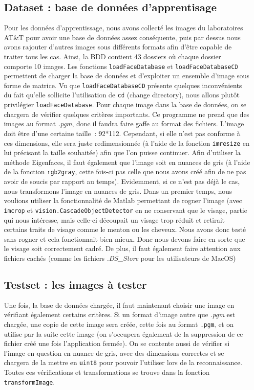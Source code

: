 \documentclass[12pt,a4paper]{article}
\begin{document}
\subsection{Dataset : base de données d'apprentisage}
Pour les données d'apprentissage, nous avons collecté les images du laboratoires AT\&T pour avoir une base de données assez conséquente, puis par dessus nous avons rajouter d'autres images sous différents formats afin d'être capable de traiter tous les cas.
Ainsi, la BDD contient 43 dossiers où chaque dossier comporte 10 images.
\newline
Les fonctions \texttt{loadFaceDatabase} et  \texttt{loadFaceDatabaseCD} permettent de charger la base de données et d'exploiter un ensemble d'image sous forme de matrice. Vu que \texttt{loadFaceDatabaseCD} présente quelques inconvénients du fait qu'elle sollicite l'utilisation de \texttt{cd} (change directory), nous allons plutôt privilégier \texttt{loadFaceDatabase}. 
\newline
Pour chaque image dans la base de données, on se chargera de vérifier quelques critères importants. Ce programme ne prend que des images au format \textit{.pgm}, donc il faudra faire gaffe au format des fichiers. L’image doit être d’une certaine taille : 92*112. Cependant, si elle n’est pas conforme à ces dimensions, elle sera juste redimensionnée (à l'aide de la fonction \texttt{imresize} en lui précisant la taille souhaitée) afin que l’on puisse continuer. Afin d’utiliser la méthode Eigenfaces, il faut également que l’image soit en nuances de gris (à l'aide de la fonction \texttt{rgb2gray}, cette fois-ci pas celle que nous avons créé afin de ne pas avoir de soucis par rapport au temps). Evidemment, si ce n’est pas déjà le cas, nous transformons l’image en nuances de gris. Dans un premier temps, nous voulions utiliser la fonctionnalité de Matlab permettant de rogner l’image (avec \texttt{imcrop} et \texttt{vision.CascadeObjectDetector} en ne conservant que le visage, partie qui nous intéresse, mais celle-ci découpait un visage trop réduit et retirait certains traits de visage comme le menton ou les cheveux. Nous avons donc testé sans rogner et cela fonctionnait bien mieux. Donc nous devons faire en sorte que le visage soit correctement cadré. De plus, il faut également faire attention aux fichiers cachés (comme les fichiers \textit{.DS\_Store} pour les utilisateurs de MacOS)

\subsection{Testset : les images à tester}
Une fois, la base de données chargée, il faut maintenant choisir une image en vérifiant également certains critères. Si un format d’image autre que \textit{.pgm} est chargée, une copie de cette image sera créée, cette fois au format \texttt{.pgm}, et on utilise par la suite cette image (on s'occupera également de la suppression de ce fichier créé une fois l'application fermée). On se contente aussi de vérifier si l'image en question en nuance de gris, avec des dimensions correctes et se chargera de la mettre en \texttt{uint8} pour pouvoir l'utiliser lors de la reconnaissance. Toutes ces vérifications et transformations se trouve dans la fonction \texttt{transformImage}.
\end{document}
